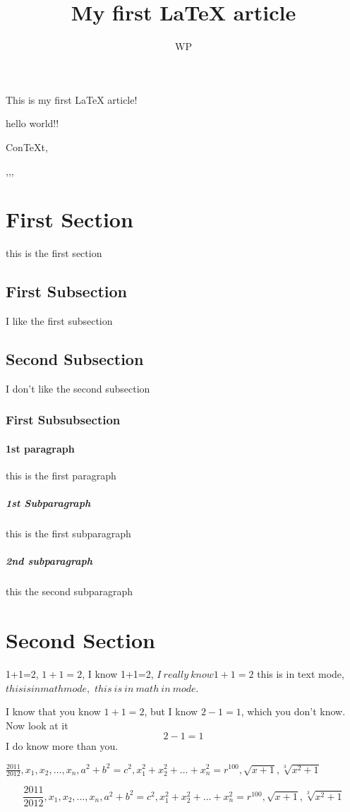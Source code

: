 \documentclass{article}
\author{WP}
\title{My first \LaTeX{} article}
\begin{document}
    \maketitle  %
    This is my first \LaTeX{} article!
    
    hello world!!
    
    Con\TeX{}t,
    
    \METAFONT,\MF,\quad,\MP
    
    \section{First Section}
    this is the first section
    \subsection{First Subsection}
    I like the first subsection
    \subsection{Second Subsection}
    I don't like the second subsection
    \subsubsection{First Subsubsection}
    \paragraph{1st paragraph}
    this is the first paragraph
    \subparagraph{1st Subparagraph}
    this is the first subparagraph
    \subparagraph{2nd subparagraph}
    this the second subparagraph
    \section{Second Section}
    1+1=2, $1+1=2$, I know 1+1=2, $I\ really\ know 1+1=2$
    this is in text mode, $this is in math mode,$ $this\ is\ in\ math\ in\ mode.$
    
    I know that you know $1+1=2$, but I know $2-1=1$, which you don't know. Now look at it $$2-1=1$$ I do know more than you.
    
    $\frac{2011}{2012}, x_1,x_2,\ldots,x_n, a^2+b^2=c^2, x_1^2+x_2^2+\dots+x_n^2=r^{100}, \sqrt{x+1}, \sqrt[3]{x^2+1}$
    
    $$\frac{2011}{2012}, x_1,x_2,\ldots,x_n, a^2+b^2=c^2, x_1^2+x_2^2+\dots+x_n^2=r^{100}, \sqrt{x+1}, \sqrt[3]{x^2+1}$$
    
\end{document}
